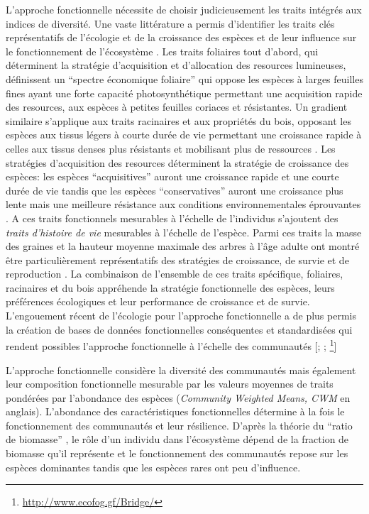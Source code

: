 \documentclass[
  11pt,
  french,
  A4paper,
  extrafontsizes,onecolumn,openright
  ]{memoir}
\begin{document}
L'approche fonctionnelle nécessite de choisir judicieusement les traits
intégrés aux indices de diversité. Une vaste littérature a permis
d'identifier les traits clés représentatifs de l'écologie et de la
croissance des espèces et de leur influence sur le fonctionnement de
l'écosystème \autocite{Reich2014}. Les traits foliaires tout d'abord,
qui déterminent la stratégie d'acquisition et d'allocation des resources
lumineuses, définissent un ``spectre économique foliaire'' qui oppose
les espèces à larges feuilles fines ayant une forte capacité
photosynthétique permettant une acquisition rapide des resources, aux
espèces à petites feuilles coriaces et résistantes. Un gradient
similaire s'applique aux traits racinaires et aux propriétés du bois,
opposant les espèces aux tissus légers à courte durée de vie permettant
une croissance rapide à celles aux tissus denses plus résistants et
mobilisant plus de ressources
\autocites{Chave2009}{Valverde-Barrantes2017}. Les stratégies
d'acquisition des resources déterminent la stratégie de croissance des
espèces: les espèces ``acquisitives'' auront une croissance rapide et
une courte durée de vie tandis que les espèces ``conservatives'' auront
une croissance plus lente mais une meilleure résistance aux conditions
environnementales éprouvantes \autocites{Reich1997}{Wright2004}. A ces
traits fonctionnels mesurables à l'échelle de l'individus s'ajoutent des
\emph{traits d'histoire de vie} mesurables à l'échelle de l'espèce.
Parmi ces traits la masse des graines et la hauteur moyenne maximale des
arbres à l'âge adulte ont montré être particulièrement représentatifs
des stratégies de croissance, de survie et de reproduction
\autocites{Westoby1998}{Herault2011}. La combinaison de l'ensemble de
ces traits spécifique, foliaires, racinaires et du bois appréhende la
stratégie fonctionnelle des espèces, leurs préférences écologiques et
leur performance de croissance et de survie. L'engouement récent de
l'écologie pour l'approche fonctionnelle a de plus permis la création de
bases de données fonctionnelles conséquentes et standardisées qui
rendent possibles l'approche fonctionnelle à l'échelle des communautés
{[}\textcite{Kattge2011}; \textcite{Perez-Harguindeguy2013}; \footnote{\url{http://www.ecofog.gf/Bridge/}}{]}

L'approche fonctionnelle considère la diversité des communautés mais
également leur composition fonctionnelle mesurable par les valeurs
moyennes de traits pondérées par l'abondance des espèces
(\emph{Community Weighted Means, CWM} en anglais). L'abondance des
caractéristiques fonctionnelles détermine à la fois le fonctionnement
des communautés et leur résilience. D'après la théorie du ``ratio de
biomasse'' \autocite{Grime1998}, le rôle d'un individu dans l'écosystème
dépend de la fraction de biomasse qu'il représente et le fonctionnement
des communautés repose sur les espèces dominantes tandis que les espèces
rares ont peu d'influence.
\end{document}
